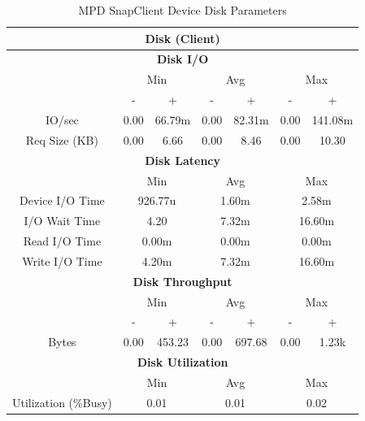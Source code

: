 \documentclass[11pt,a4paper]{scrreprt}
\begin{document}
\begin{table}[H]
\centering
    \begin{tabular}{||c|c|c|c|c|c|c||}
    \hline
    \multicolumn{7}{|c|}{\textbf{Disk (Client)}} \\
    \hline
    \multicolumn{7}{|c|}{\textbf{Disk I/O}} \\
    \hline\hline
      & \multicolumn{2}{|c|}{Min} & \multicolumn{2}{|c|}{Avg} & \multicolumn{2}{|c|}{Max} \\
    \hline
      & - & + & - & + & - & + \\
    \hline
    IO/sec & 0.00 & 66.79m & 0.00 & 82.31m & 0.00 & 141.08m \\
    \hline
    Req Size (KB) & 0.00 & 6.66 & 0.00 & 8.46 & 0.00 & 10.30 \\
    \hline\hline
    \multicolumn{7}{|c|}{\textbf{Disk Latency}} \\
    \hline\hline
      & \multicolumn{2}{|c|}{Min} & \multicolumn{2}{|c|}{Avg} & \multicolumn{2}{|c|}{Max} \\
    \hline
    Device I/O Time  & \multicolumn{2}{|c|}{926.77u} & \multicolumn{2}{|c|}{1.60m} & \multicolumn{2}{|c|}{2.58m} \\
    \hline
    I/O Wait Time  & \multicolumn{2}{|c|}{4.20} & \multicolumn{2}{|c|}{7.32m} & \multicolumn{2}{|c|}{16.60m} \\
    \hline
    Read I/O Time  & \multicolumn{2}{|c|}{0.00m} & \multicolumn{2}{|c|}{0.00m} & \multicolumn{2}{|c|}{0.00m} \\
    \hline
    Write I/O Time  & \multicolumn{2}{|c|}{4.20m} & \multicolumn{2}{|c|}{7.32m} & \multicolumn{2}{|c|}{16.60m} \\
    \hline\hline
    \multicolumn{7}{|c|}{\textbf{Disk Throughput}} \\
    \hline\hline
      & \multicolumn{2}{|c|}{Min} & \multicolumn{2}{|c|}{Avg} & \multicolumn{2}{|c|}{Max} \\
    \hline
      & - & + & - & + & - & + \\
    \hline
    Bytes & 0.00 & 453.23 & 0.00 & 697.68 & 0.00 & 1.23k \\
    \hline\hline
    \multicolumn{7}{|c|}{\textbf{Disk Utilization}} \\
    \hline\hline
      & \multicolumn{2}{|c|}{Min} & \multicolumn{2}{|c|}{Avg} & \multicolumn{2}{|c|}{Max} \\
    \hline
    Utilization (\%Busy)  & \multicolumn{2}{|c|}{0.01} & \multicolumn{2}{|c|}{0.01} & \multicolumn{2}{|c|}{0.02} \\
    \hline\hline
    \end{tabular}
    \caption{MPD SnapClient Device Disk Parameters}
    \label{MPDclientDiskTab}
\end{table}
\end{document}
